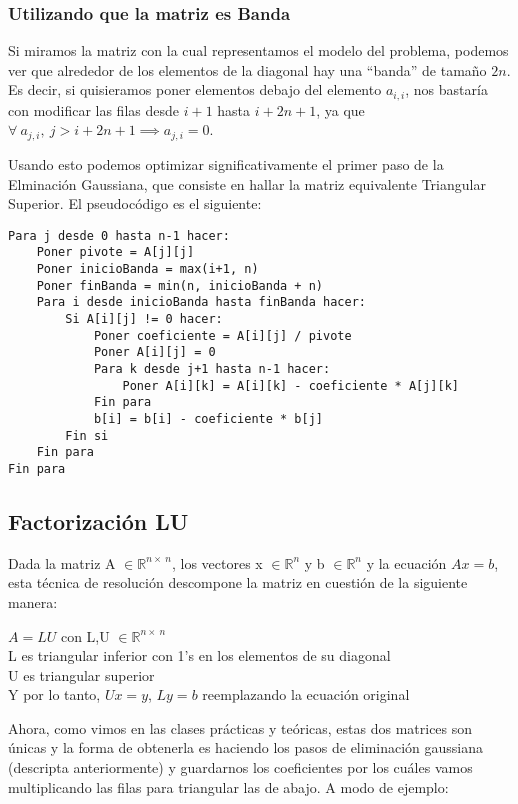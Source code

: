 \subsubsection{Utilizando que la matriz es Banda}

Si miramos la matriz con la cual representamos el modelo del problema, podemos ver que alrededor de los elementos de la diagonal hay una ``banda'' de tamaño $2n$.
Es decir, si quisieramos poner elementos debajo del elemento $a_{i,i}$, nos bastaría con modificar las filas desde $i+1$ hasta $i+2n+1$, ya que $\forall\ a_{j,i},\ j> i+2n+1 \implies a_{j,i} = 0$.

Usando esto podemos optimizar significativamente el primer paso de la Elminación Gaussiana, que consiste en hallar la matriz equivalente Triangular Superior. El pseudocódigo es el siguiente:

\begin{lstlisting}
Para j desde 0 hasta n-1 hacer:
    Poner pivote = A[j][j]
    Poner inicioBanda = max(i+1, n)
    Poner finBanda = min(n, inicioBanda + n)
    Para i desde inicioBanda hasta finBanda hacer:
        Si A[i][j] != 0 hacer:
            Poner coeficiente = A[i][j] / pivote
            Poner A[i][j] = 0
            Para k desde j+1 hasta n-1 hacer:
                Poner A[i][k] = A[i][k] - coeficiente * A[j][k]
            Fin para
            b[i] = b[i] - coeficiente * b[j]
        Fin si
    Fin para
Fin para
\end{lstlisting}

\subsection{Factorización LU}

Dada la matriz A $\in \mathbb{R}^{n \times\ n}$, los vectores x $\in \mathbb{R}^{n}$ y b $\in \mathbb{R}^{n}$ y la ecuación $Ax = b$, esta técnica de resolución descompone la matriz en cuestión de la siguiente manera:

\begin{center}
    $A = LU$ con L,U $\in \mathbb{R}^{n \times\ n}$\\
    L es triangular inferior con 1's en los elementos de su diagonal\\
    U es triangular superior\\
    Y por lo tanto, $Ux = y$, $Ly = b$ reemplazando la ecuación original
\end{center}

Ahora, como vimos en las clases prácticas y teóricas, estas dos matrices son únicas y la forma de obtenerla es haciendo los pasos de eliminación gaussiana (descripta anteriormente) y guardarnos los coeficientes por los cuáles vamos multiplicando las filas para triangular las de abajo. A modo de ejemplo:

